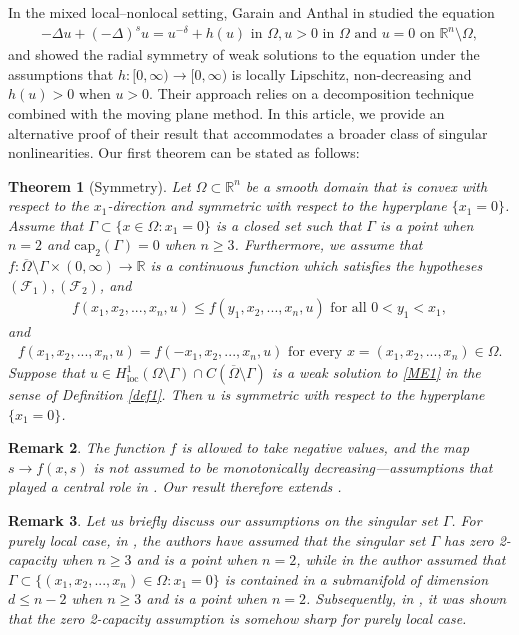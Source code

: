 \documentclass[11pt, notitlepage]{article}
\def\R{\mathbb{R}}
\newtheorem{Theorem}{Theorem}[section]
\newtheorem{Remark}[Theorem]{Remark}
\begin{document}
{In the mixed local–nonlocal setting, Garain and Anthal in \cite{GG25} studied the equation
  \begin{align}
       -\Delta u+(-\Delta)^su=u^{-\delta}+h(u)\text{ in }\Omega,
        u>0\text{ in }\Omega\text{ and }u=0 \text{ on }\mathbb{R}^n\setminus \Omega,
  \end{align}
  and showed the radial symmetry of weak solutions to the equation under the assumptions that $h:[0,\infty)\to [0,\infty)$ is locally Lipschitz, non-decreasing and $h(u)>0$ when $u>0$. Their approach relies on a decomposition technique combined with the moving plane method. In this article, we provide an alternative proof of their result that accommodates a broader class of singular nonlinearities. Our first theorem can be stated as follows:
  \begin{Theorem}[Symmetry]\label{T1}
    Let $\Omega\subset\R^n$ be a smooth domain that is convex with respect to the $x_1$-direction and symmetric with respect to the hyperplane $\{x_1=0\}$. Assume that $\Gamma\subset \{x\in\Omega: x_1=0\}$ is a closed set such that $\Gamma$ is a point when $n=2$ and $\mathrm{cap}_2(\Gamma)=0$ when $n\geq 3$. Furthermore, we assume that $f:\overline{\Omega}\setminus\Gamma\times(0,\infty)\to\R$ is a continuous function which satisfies the hypotheses $(\mathscr{F}_1), (\mathscr{F}_2)$, and 
    \begin{align}\label{mp}
        f(x_1,x_2,...,x_n,u)\leq f(y_1,x_2,...,x_n,u)\text{ for all }0<y_1<x_1,
    \end{align}
    and 
    \begin{align}\label{sp}
        f(x_1,x_2,...,x_n,u)=f(-x_1,x_2,...,x_n,u)\text{ for every }x=(x_1,x_2,...,x_n)\in\Omega.
    \end{align}
    Suppose that $u\in H^1_{\mathrm{loc}}(\Omega\setminus\Gamma)\cap C(\overline{\Omega}\setminus\Gamma)$ is a weak solution to \eqref{ME1} in the sense of Definition \ref{def1}. Then $u$ is symmetric with respect to the hyperplane $\{x_1=0\}$. 
\end{Theorem}
  \begin{Remark}
      The function $f$ is allowed to take negative values, and the map $s\to f(x,s)$ is not assumed to be monotonically decreasing---assumptions that played a central role in \cite[Theorem 2.14]{GG25}. Our result therefore extends \cite[Theorem 2.14]{GG25}.
  \end{Remark}
 \begin{Remark}
      Let us briefly discuss our assumptions on the singular set $\Gamma$. For purely local case, in \cite[Theorem 1.3]{SciunziJDE18}, the authors have assumed that the singular set $\Gamma$ has zero 2-capacity when $n\geq 3$ and is a point when $n=2$, while in \cite[Theorem 1.1]{SciunziJMPA17} the author assumed that $\Gamma\subset\{(x_1,x_2,...,x_n)\in \Omega:x_1=0\}$ is contained in a submanifold of dimension $d\leq n-2$ when $n\geq 3$ and is a point when $n=2$. Subsequently, in \cite[Example 1, Example 2, page 630]{BV20}, it was shown that the zero 2-capacity assumption is somehow sharp for purely local case. 
      

\end{Remark}}
\end{document}
